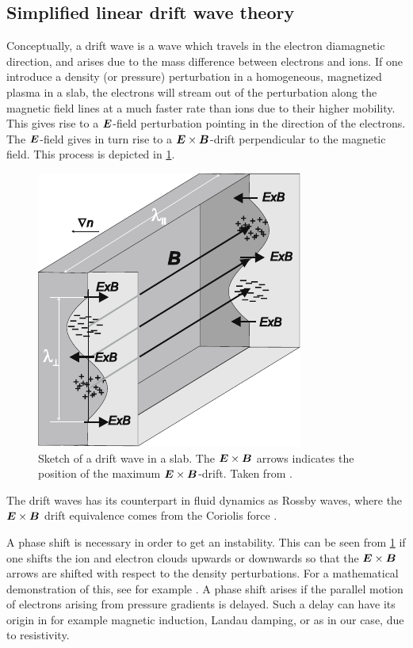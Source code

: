 \subsection{Simplified linear drift wave theory}
\label{sec:simpleLin}
%
Conceptually, a drift wave is a wave which travels in the electron diamagnetic direction, and arises due to the mass difference between electrons and ions.
If one introduce a density (or pressure) perturbation in a homogeneous, magnetized plasma in a slab, the  electrons will stream out of the perturbation along the magnetic field lines at a much faster rate than ions due to their higher mobility.
This gives rise to a $\boldsymbol{E}$-field perturbation pointing in the direction of the electrons.
The $\boldsymbol{E}$-field gives in turn rise to a $\boldsymbol{E}\times\boldsymbol{B}$-drift perpendicular to the magnetic field.
This process is depicted in \cref{fig:DW}.
%
\begin{figure}[htb]
    \centering
    \includegraphics{fig/driftwave}
    \caption{
        Sketch of a drift wave in a slab.
        The $\boldsymbol{E}\times\boldsymbol{B}$ arrows indicates the position of the maximum $\boldsymbol{E}\times\boldsymbol{B}$-drift.
        Taken from \cite{Stroth2011book}.
    }
    \label{fig:DW}
\end{figure}
%
The drift waves has its counterpart in fluid dynamics as Rossby waves, where the $\boldsymbol{E}\times\boldsymbol{B}$ drift equivalence comes from the Coriolis force \cite{Shepherd1987}.

A phase shift is necessary in order to get an instability.
This can be seen from \cref{fig:DW} if one shifts the ion and electron clouds upwards or downwards so that the $\boldsymbol{E}\times\boldsymbol{B}$ arrows are shifted with respect to the density perturbations.
For a mathematical demonstration of this, see for example \cite{Garcia2001a}.
A phase shift arises if the parallel motion of electrons arising from pressure gradients is delayed.
Such a delay can have its origin in for example magnetic induction, Landau damping, or as in our case, due to resistivity.

